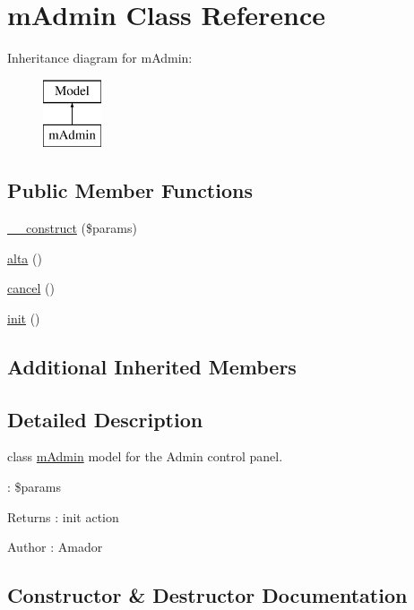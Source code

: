 \hypertarget{classmAdmin}{}\section{m\+Admin Class Reference}
\label{classmAdmin}
Inheritance diagram for m\+Admin\+:\begin{figure}[H]
\begin{center}
\leavevmode
\includegraphics[height=2.000000cm]{classmAdmin}
\end{center}
\end{figure}
\subsection*{Public Member Functions}
\begin{DoxyCompactItemize}
\item 
\hyperlink{classmAdmin_a2f024286a1a259d930bc97776bf0686d}{\+\_\+\+\_\+construct} (\$params)
\item 
\hyperlink{classmAdmin_a0966993e7fea6d475ddd9e9a997b59fc}{alta} ()
\item 
\hyperlink{classmAdmin_acaa8b41d3f4314aa1f21224fbca87247}{cancel} ()
\item 
\hyperlink{classmAdmin_a4523dfd6be34e7897f1dda5a27415ebc}{init} ()
\end{DoxyCompactItemize}
\subsection*{Additional Inherited Members}


\subsection{Detailed Description}
class \hyperlink{classmAdmin}{m\+Admin} model for the Admin control panel.

\+: \$params \begin{DoxyReturn}{Returns}
\+: init action 
\end{DoxyReturn}
\begin{DoxyAuthor}{Author}
\+: Amador 
\end{DoxyAuthor}


\subsection{Constructor \& Destructor Documentation}
\hypertarget{classmAdmin_a2f024286a1a259d930bc97776bf0686d}{}
